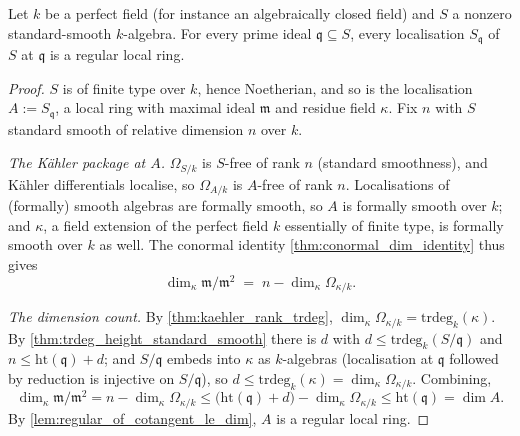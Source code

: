 \begin{theorem}
  \label{thm:smooth_prime_regularity}
  \leanok
  Let \(k\) be a perfect field (for instance an algebraically closed field) and \(S\) a
  nonzero standard-smooth \(k\)-algebra. For every prime ideal
  \(\mathfrak q \subseteq S\), every localisation \(S_{\mathfrak q}\) of \(S\) at
  \(\mathfrak q\) is a regular local ring.
\end{theorem}
\begin{proof}
  \leanok
  \(S\) is of finite type over \(k\), hence Noetherian, and so is the localisation
  \(A := S_{\mathfrak q}\), a local ring with maximal ideal \(\mathfrak m\) and residue
  field \(\kappa\). Fix \(n\) with \(S\) standard smooth of relative dimension \(n\)
  over \(k\).

  \emph{The K\"ahler package at \(A\).} \(\Omega_{S/k}\) is \(S\)-free of rank \(n\)
  (standard smoothness), and K\"ahler differentials localise, so \(\Omega_{A/k}\) is
  \(A\)-free of rank \(n\). Localisations of (formally) smooth algebras are formally
  smooth, so \(A\) is formally smooth over \(k\); and \(\kappa\), a field extension of
  the perfect field \(k\) essentially of finite type, is formally smooth over \(k\) as
  well. The conormal identity \ref{thm:conormal_dim_identity} thus gives
  \[
    \dim_\kappa \mathfrak m/\mathfrak m^2 \;=\; n - \dim_\kappa \Omega_{\kappa/k}.
  \]

  \emph{The dimension count.} By \ref{thm:kaehler_rank_trdeg},
  \(\dim_\kappa \Omega_{\kappa/k} = \mathrm{trdeg}_k(\kappa)\). By
  \ref{thm:trdeg_height_standard_smooth} there is \(d\) with
  \(d \leq \mathrm{trdeg}_k(S/\mathfrak q)\) and
  \(n \leq \mathrm{ht}(\mathfrak q) + d\); and \(S/\mathfrak q\) embeds into \(\kappa\)
  as \(k\)-algebras (localisation at \(\mathfrak q\) followed by reduction is injective
  on \(S/\mathfrak q\)), so
  \(d \leq \mathrm{trdeg}_k(\kappa) = \dim_\kappa \Omega_{\kappa/k}\). Combining,
  \[
    \dim_\kappa \mathfrak m/\mathfrak m^2
      = n - \dim_\kappa \Omega_{\kappa/k}
      \leq \bigl(\mathrm{ht}(\mathfrak q) + d\bigr) - \dim_\kappa \Omega_{\kappa/k}
      \leq \mathrm{ht}(\mathfrak q) = \dim A.
  \]
  By \ref{lem:regular_of_cotangent_le_dim}, \(A\) is a regular local ring.
\end{proof}
